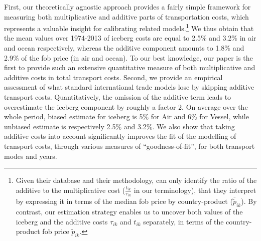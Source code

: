 \documentclass[a4paper,11pt]{article}
\begin{document}
First, our theoretically agnostic approach provides a fairly simple framework for measuring both multiplicative and additive parts of transportation costs, which represents a valuable insight for calibrating related models.\footnote{Given their database and their methodology, \citet{Irrazabal_2015} can only identify the ratio of the additive to the multiplicative cost ($\frac{t_{ik}}{\tau_{ik}}$ in our terminology), that they interpret by expressing it in terms of the median fob price by country-product ($\bar{\widetilde{p}}_{ik}$). By contrast, our estimation strategy enables us to uncover both values of the iceberg and the additive costs $\tau_{ik}$ and $t_{ik}$ separately, in terms of the country-product fob price $\widetilde{p}_{ik}$.} We thus obtain that the mean values over 1974-2013 of iceberg costs are equal to 2.5\% and 3.2\% in air and ocean respectively, whereas the additive component amounts to 1.8\% and 2.9\% of the fob price (in air and ocean). To our best knowledge, our paper is the first to provide such an extensive quantitative measure of both multiplicative and additive costs in total transport costs. Second, we provide an empirical assessment of what standard international trade models lose by skipping additive transport costs. Quantitatively, the omission of the additive term leads to overestimate the iceberg component by roughly a factor 2. On average over the whole period, biased estimate for iceberg is 5\% for Air and 6\% for Vessel, while unbiased estimate is respectively 2.5\% and 3.2\%. We also show that taking additive costs into account significantly improves the fit of the modelling of transport costs, through various measures of ``goodness-of-fit'', for both transport modes and years.
\end{document}
